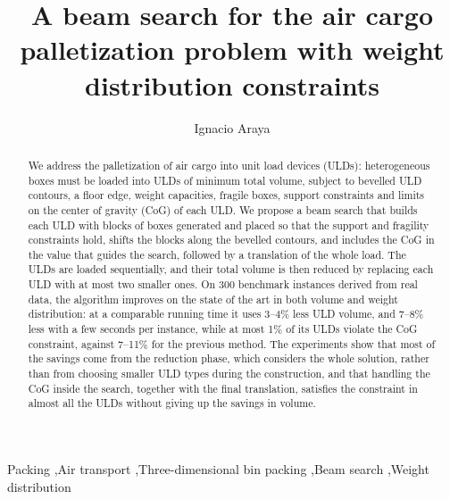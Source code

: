 \documentclass[preprint,12pt,authoryear]{elsarticle}
\begin{document}
\begin{frontmatter}

\title{A beam search for the air cargo palletization problem with weight distribution constraints}

\author{Ignacio Araya}

\begin{abstract}
We address the palletization of air cargo into unit load devices (ULDs): heterogeneous boxes must
be loaded into ULDs of minimum total volume, subject to bevelled ULD contours, a floor edge,
weight capacities, fragile boxes, support constraints and limits on the center of gravity (CoG)
of each ULD. We propose a beam search that builds each ULD with blocks of boxes generated and
placed so that the support and fragility constraints hold, shifts the blocks along the bevelled
contours, and includes the CoG in the value that guides the search, followed by a translation of
the whole load. The ULDs are loaded sequentially, and their total volume is then reduced by
replacing each ULD with at most two smaller ones. On 300 benchmark instances derived from real
data, the algorithm improves on the state of the art in both volume and weight distribution: at
a comparable running time it uses 3--4\% less ULD volume, and 7--8\% less with a few seconds per
instance, while at most 1\% of its ULDs violate the CoG constraint, against 7--11\% for the
previous method. The experiments show that most of the savings come from the reduction phase,
which considers the whole solution, rather than from choosing smaller ULD types during the
construction, and that handling the CoG inside the search, together with the final translation,
satisfies the constraint in almost all the ULDs without giving up the savings in volume.
\end{abstract}

\begin{keyword}
Packing \sep Air transport \sep Three-dimensional bin packing \sep Beam search \sep Weight distribution
\end{keyword}

\end{frontmatter}








\end{document}
